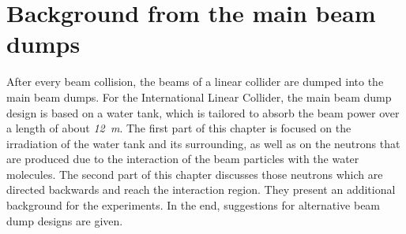 \chapter{Background from the main beam dumps}
\label{BeamDumps}

\begin{chapterabstract}
 After every beam collision, the beams of a linear collider are dumped into the main beam dumps.
 For the International Linear Collider, the main beam dump design is based on a water tank, which is tailored to absorb the beam power over a length of about \textit{\SI[detect-all]{12}{\meter}}.
 The first part of this chapter is focused on the irradiation of the water tank and its surrounding, as well as on the neutrons that are produced due to the interaction of the beam particles with the water molecules.
 The second part of this chapter discusses those neutrons which are directed backwards and reach the interaction region.
 They present an additional background for the experiments.
 In the end, suggestions for alternative beam dump designs are given.
\end{chapterabstract}

